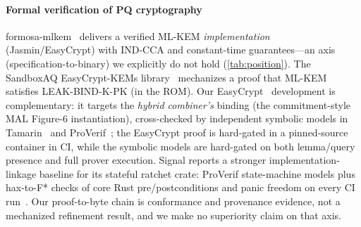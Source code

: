 \documentclass[journal]{IEEEtran}
\begin{document}
\paragraph*{Formal verification of PQ cryptography}
formosa-mlkem~\cite{formosa} delivers a verified ML-KEM \emph{implementation} (Jasmin/EasyCrypt) with
IND-CCA and constant-time guarantees---an axis (specification-to-binary) we explicitly do not hold
(\cref{tab:position}). The SandboxAQ EasyCrypt-KEMs library~\cite{eckems} mechanizes a proof that
ML-KEM satisfies \mbox{LEAK-BIND-K-PK} (in the ROM). Our EasyCrypt~\cite{easycrypt} development is complementary: it targets the \emph{hybrid
combiner's} binding (the commitment-style MAL Figure-6 instantiation), cross-checked by
independent symbolic models in Tamarin~\cite{tamarin} and ProVerif~\cite{proverif}; the EasyCrypt
proof is hard-gated in a pinned-source container in CI, while the symbolic models are hard-gated on both
lemma/query presence and full prover execution.
Signal reports a stronger implementation-linkage baseline for its stateful ratchet crate:
ProVerif state-machine models plus hax-to-F* checks of core Rust pre/postconditions and panic freedom
on every CI run~\cite{signalspqr}. Our proof-to-byte chain is conformance and provenance evidence,
not a mechanized refinement result, and we make no superiority claim on that axis.
\end{document}
